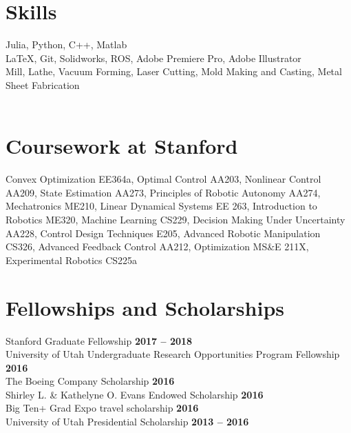 \documentclass[margin,line]{res}
\begin{document}
\begin{resume}
\section{\sc Skills}
Julia, Python, C++, Matlab\\
\LaTeX, Git, Solidworks, ROS, Adobe Premiere Pro, Adobe Illustrator \\
Mill, Lathe, Vacuum Forming, Laser Cutting, Mold Making and Casting, Metal Sheet Fabrication\\
\\
\section{\sc Coursework at Stanford}
Convex Optimization EE364a, Optimal Control AA203, Nonlinear Control AA209, State Estimation AA273, Principles of Robotic Autonomy AA274, Mechatronics ME210, Linear Dynamical Systems EE 263, Introduction to Robotics ME320, Machine Learning CS229, Decision Making Under Uncertainty AA228, Control Design Techniques E205, Advanced Robotic Manipulation CS326, Advanced Feedback Control AA212, Optimization MS\&E 211X, Experimental Robotics CS225a
\\

\section{\sc Fellowships and Scholarships}
 Stanford Graduate Fellowship \hfill {\bf 2017 – 2018}\\
University of Utah Undergraduate Research Opportunities Program Fellowship \hfill {\bf 2016}\\
The Boeing Company Scholarship \hfill {\bf 2016}\\
Shirley L. \& Kathelyne O. Evans Endowed Scholarship \hfill {\bf 2016}\\
Big Ten+ Grad Expo travel scholarship \hfill {\bf 2016}\\
University of Utah Presidential Scholarship \hfill {\bf 2013 – 2016}
\\


\end{resume}
\end{document}
